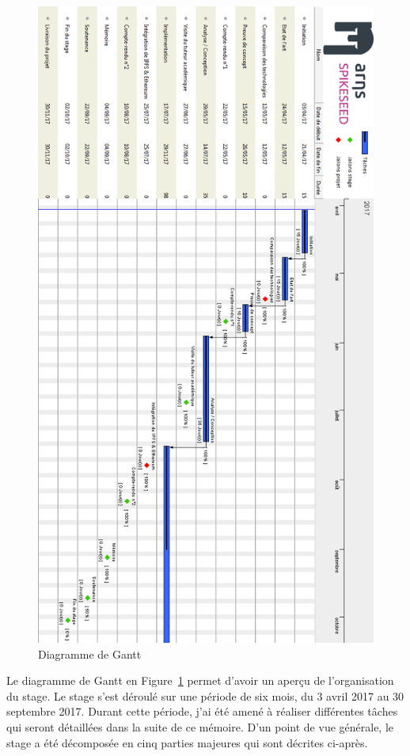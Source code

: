 \documentclass{tnreport}
\begin{document}
\begin{figure}[h]
	\centering
	\includegraphics[scale=0.67]{figures/gantt-stage-vertical}
	\caption{Diagramme de Gantt}
	\label{fig:gantt}
\end{figure}

\clearpage

Le diagramme de Gantt en Figure~\ref{fig:gantt} permet d'avoir un aperçu de l'organisation du stage. Le stage s'est déroulé sur une période de six mois, du 3 avril 2017 au 30 septembre 2017. Durant cette période, j'ai été amené à réaliser différentes tâches qui seront détaillées dans la suite de ce mémoire. D'un point de vue générale, le stage a été décomposée en cinq parties majeures qui sont décrites ci-après.
\end{document}
